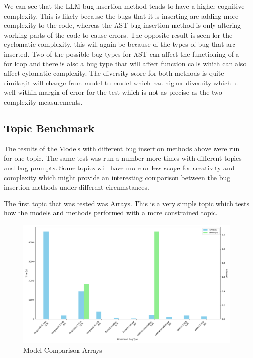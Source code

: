 \documentclass[12pt]{extarticle}
\begin{document}
We can see that the LLM bug insertion method tends to have a higher cognitive complexity. This is likely because the bugs that it is inserting are adding more complexity to the code, whereas the AST bug insertion method is only altering working parts of the code to cause errors. The opposite result is seen for the cyclomatic complexity, this will again be because of the types of bug that are inserted. Two of the possible bug types for AST can affect the functioning of a for loop and there is also a bug type that will affect function calls which can also affect cylomatic complexity. The diversity score for both methods is quite similar,it will change from model to model which has higher diversity which is well within margin of error for the test which is not as precise as the two complexity measurements.

\subsection{Topic Benchmark}

The results of the Models with different bug insertion methods above were run for one topic. The same test was run a number more times with different topics and bug prompts. Some topics will have more or less scope for creativity and complexity which might provide an interesting comparison between the bug insertion methods under different circumstances.

The first topic that was tested was Arrays. This is a very simple topic which tests how the models and methods performed with a more constrained topic.

\begin{figure}[h!]
\centering
\includegraphics[width=0.8\linewidth]{Images/Model_Comparison_Arrays.png}
\caption{Model Comparison Arrays}
\label{fig:Model_Comparison_Arrays}
\end{figure}
\end{document}
